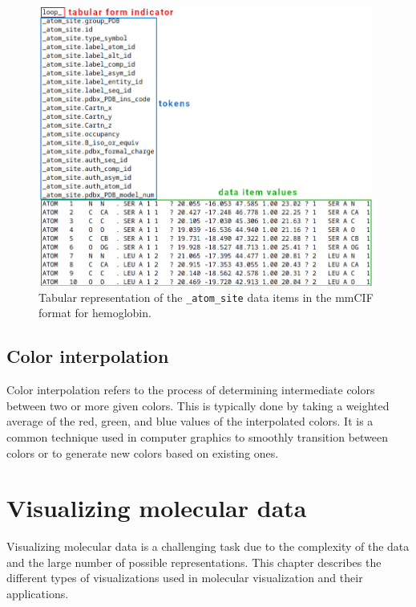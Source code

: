 \documentclass[
  digital,     %
  oneside,     %
  nosansbold,  %
  nocolorbold, %
  lof,         %
  lot,         %
]{fithesis4}
\begin{document}
\begin{figure}[htbp]
  \begin{center}
    \includegraphics[width=11cm]{figures/3bj1_mmcif.png}
  \end{center}
  \caption{Tabular representation of the \texttt{\_atom\_site} data items in the mmCIF format for hemoglobin.}
  \label{fig:mmcif}
\end{figure}

\section {Color interpolation}
\label{section:color_interpolation}



Color interpolation refers to the process of determining intermediate colors between two or more given colors. This is typically done by taking a weighted average of the red, green, and blue values of the interpolated colors. It is a common technique used in computer graphics to smoothly transition between colors or to generate new colors based on existing ones. \cite{zucconi2016secrets}

\newpage
\chapter{Visualizing molecular data}
\label{chapter:visualizing_molecular_data}


Visualizing molecular data is a challenging task due to the complexity of the data and the large number of possible representations. This chapter describes the different types of visualizations used in molecular visualization and their applications.
\end{document}
